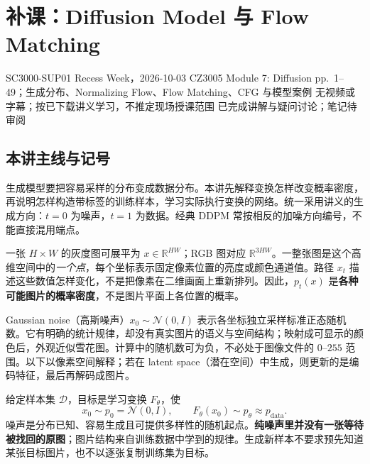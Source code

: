 \section{补课：Diffusion Model 与 Flow Matching}
\label{lecture:SC3000-SUP01}

\lecturemeta
  {SC3000-SUP01}
  {Recess Week，2026-10-03}
  {CZ3005 Module 7: Diffusion}
  {pp.~1--49；生成分布、Normalizing Flow、Flow Matching、CFG 与模型案例}
  {无视频或字幕；按已下载讲义学习，不推定现场授课范围}
  {已完成讲解与疑问讨论；笔记待审阅}

\subsection{本讲主线与记号}

生成模型要把容易采样的分布变成数据分布。本讲先解释变换怎样改变概率密度，再说明怎样构造带标签的训练样本，学习实际执行变换的网络。统一采用讲义的生成方向：$t=0$ 为噪声，$t=1$ 为数据。经典 DDPM 常按相反的加噪方向编号，不能直接混用端点。


一张 $H\times W$ 的灰度图可展平为 $x\in\mathbb R^{HW}$；RGB 图对应 $\mathbb R^{3HW}$。一整张图是这个高维空间中的\emph{一个点}，每个坐标表示固定像素位置的亮度或颜色通道值。路径 $x_t$ 描述这些数值怎样变化，不是把像素在二维画面上重新排列。因此，$p_t(x)$ 是\textbf{各种可能图片的概率密度}，不是图片平面上各位置的概率。

Gaussian noise（高斯噪声）$x_0\sim\mathcal N(0,I)$ 表示各坐标独立采样标准正态随机数。它有明确的统计规律，却没有真实图片的语义与空间结构；映射成可显示的颜色后，外观近似雪花图。计算中的随机数可为负，不必处于图像文件的 $0$--$255$ 范围。以下以像素空间解释；若在 latent space（潜在空间）中生成，则更新的是编码特征，最后再解码成图片。

给定样本集 $\mathcal D$，目标是学习变换 $F_\theta$，使
\[
  x_0\sim p_0=\mathcal N(0,I),\qquad
  F_\theta(x_0)\sim p_\theta\approx p_{\mathrm{data}}.
\]
噪声是分布已知、容易生成且可提供多样性的随机起点。\textbf{纯噪声里并没有一张等待被找回的原图}；图片结构来自训练数据中学到的规律。生成新样本不要求预先知道某张目标图片，也不以逐张复制训练集为目标。


